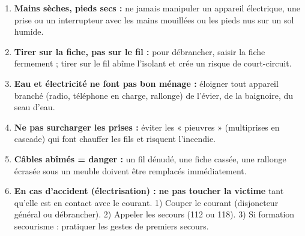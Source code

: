 \documentclass[11pt]{article}
\begin{document}
\begin{aretenir}
\begin{enumerate}
\item \textbf{Mains sèches, pieds secs :} ne jamais manipuler un appareil électrique, une prise ou un interrupteur avec les mains mouillées ou les pieds nus sur un sol humide.
\item \textbf{Tirer sur la fiche, pas sur le fil :} pour débrancher, saisir la fiche fermement ; tirer sur le fil abîme l'isolant et crée un risque de court-circuit.
\item \textbf{Eau et électricité ne font pas bon ménage :} éloigner tout appareil branché (radio, téléphone en charge, rallonge) de l'évier, de la baignoire, du seau d'eau.
\item \textbf{Ne pas surcharger les prises :} éviter les « pieuvres » (multiprises en cascade) qui font chauffer les fils et risquent l'incendie.
\item \textbf{Câbles abîmés = danger :} un fil dénudé, une fiche cassée, une rallonge écrasée sous un meuble doivent être remplacés immédiatement.
\item \textbf{En cas d'accident (électrisation) :} \textbf{ne pas toucher la victime} tant qu'elle est en contact avec le courant. 1) Couper le courant (disjoncteur général ou débrancher). 2) Appeler les secours (112 ou 118). 3) Si formation secourisme : pratiquer les gestes de premiers secours.
\end{enumerate}
\end{aretenir}
\end{document}
